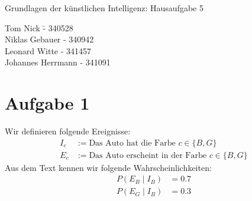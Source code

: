 \documentclass[a4paper,10pt]{article}
\begin{document}
\begin{center}
\Large{Grundlagen der künstlichen Intelligenz: Hausaufgabe 5} \\
\end{center}
\begin{tabbing}
Tom Nick \hspace{2cm}\= - 340528\\
Niklas Gebauer \> - 340942 \\
Leonard Witte \> - 341457 \\
Johannes Herrmann \> - 341091\\
\end{tabbing}

\section*{Aufgabe 1}
    Wir definieren folgende Ereignisse:
    \begin{align*}
        I_c &:= \text{Das Auto hat die Farbe $c \in \{B,G\}$} \\
        E_c &:= \text{Das Auto erscheint in der Farbe $c \in \{B, G\}$}
    \end{align*}
    Aus dem Text kennen wir folgende Wahrscheinlichkeiten:
    \begin{align*}
        P(E_B \mid I_B) &= 0.7 \\
        P(E_G \mid I_B) &= 0.3
    \end{align*}
\end{document}
